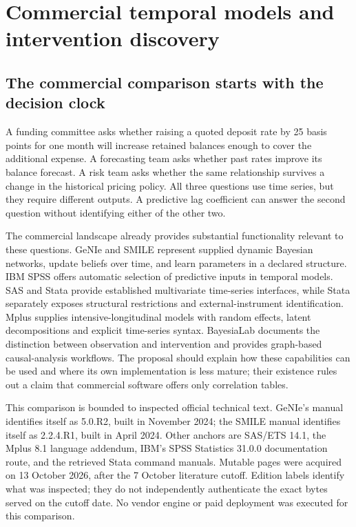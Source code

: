 \hypertarget{commercial-temporal-models-and-intervention-discovery}{%
\section{Commercial temporal models and intervention
discovery}\label{commercial-temporal-models-and-intervention-discovery}}

\label{exec13:commercial-temporal}

\hypertarget{the-commercial-comparison-starts-with-the-decision-clock}{%
\subsection{The commercial comparison starts with the decision
clock}\label{the-commercial-comparison-starts-with-the-decision-clock}}

A funding committee asks whether raising a quoted deposit rate by 25
basis points for one month will increase retained balances enough to
cover the additional expense. A forecasting team asks whether past rates
improve its balance forecast. A risk team asks whether the same
relationship survives a change in the historical pricing policy. All
three questions use time series, but they require different outputs. A
predictive lag coefficient can answer the second question without
identifying either of the other two.

The commercial landscape already provides substantial functionality
relevant to these questions. GeNIe and SMILE represent supplied dynamic
Bayesian networks, update beliefs over time, and learn parameters in a
declared structure. IBM SPSS offers automatic selection of predictive
inputs in temporal models. SAS and Stata provide established
multivariate time-series interfaces, while Stata separately exposes
structural restrictions and external-instrument identification. Mplus
supplies intensive-longitudinal models with random effects, latent
decompositions and explicit time-series syntax. BayesiaLab documents the
distinction between observation and intervention and provides
graph-based causal-analysis workflows. The proposal should explain how
these capabilities can be used and where its own implementation is less
mature; their existence rules out a claim that commercial software
offers only correlation tables.

This comparison is bounded to inspected official technical text. GeNIe's
manual identifies itself as 5.0.R2, built in November 2024; the SMILE
manual identifies itself as 2.2.4.R1, built in April 2024. Other anchors
are SAS/ETS 14.1, the Mplus 8.1 language addendum, IBM's SPSS Statistics
31.0.0 documentation route, and the retrieved Stata command manuals.
Mutable pages were acquired on 13 October 2026, after the 7 October
literature cutoff. Edition labels identify what was inspected; they do
not independently authenticate the exact bytes served on the cutoff
date. No vendor engine or paid deployment was executed for this
comparison.
\citep{exec13_genie_readme,exec13_smile_intro,exec13_ct_genie_learning,
exec13_ct_sas_causal,exec13_ct_mplus81,exec13_ct_ibm_tcm,exec13_ct_stata_granger}

